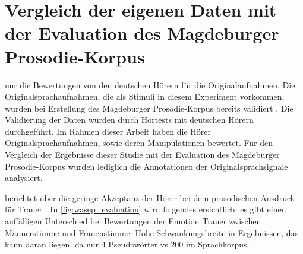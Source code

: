 \documentclass[11pt,a4paper,headsepline,twoside,toc=bibliography]{scrreprt}
\begin{document}
\section{Vergleich der eigenen Daten mit der Evaluation des Magdeburger Prosodie-Korpus}

nur die Bewertungen von den deutschen Hörern für die Originalaufnahmen.
Die Originalsprachaufnahmen, die als Stimuli in diesem Experiment vorkommen, wurden bei Erstellung des Magdeburger Prosodie-Korpus bereits validiert . Die Validierung der Daten wurden durch Hörtests mit deutschen Hörern durchgeführt. Im Rahmen dieser Arbeit haben die Hörer Originalsprachaufnahmen, sowie deren Manipulationen bewertet. Für den Vergleich der Ergebnisse dieser Studie mit der Evaluation des Magdeburger Prosodie-Korpus wurden lediglich die Annotationen der Originalsprachsignale analysiert. 

\citeauthor{Wendt2002} berichtet über die geringe Akzeptanz der Hörer bei dem prosodischen Ausdruck für Trauer \autocite{Wendt2002}. In \autoref{fig:wasep_evaluation} wird folgendes ersichtlich: es gibt einen auffälligen Unterschied bei Bewertungen der Emotion Trauer zwischen Männerstimme und Frauenstimme. 
Hohe Schwankungsbreite in Ergebnissen, das kann daran liegen, da nur 4 Pseudowörter vs 200 im Sprachkorpus. 
\end{document}
